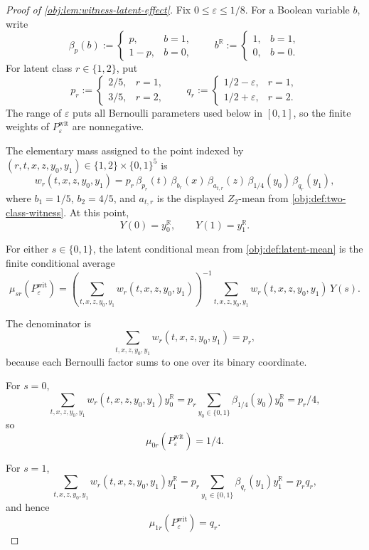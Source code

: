 \begin{proof}[Proof of \cref{obj:lem:witness-latent-effect}]
Fix \(0\le\varepsilon\le 1/8\).  For a Boolean variable \(b\), write
\[
\beta_p(b):=
\begin{cases}
p, & b=1,\\
1-p, & b=0,
\end{cases}
\qquad
b^{\mathbb R}:=
\begin{cases}
1, & b=1,\\
0, & b=0.
\end{cases}
\]
For latent class \(r\in\{1,2\}\), put
\[
p_r:=
\begin{cases}
2/5, & r=1,\\
3/5, & r=2,
\end{cases}
\qquad
q_r:=
\begin{cases}
1/2-\varepsilon, & r=1,\\
1/2+\varepsilon, & r=2.
\end{cases}
\]
The range of \(\varepsilon\) puts all Bernoulli parameters used below in \([0,1]\), so the finite weights of \(P_{\varepsilon}^{\mathrm{wit}}\) are nonnegative. %

The elementary mass assigned to the point indexed by
\((r,t,x,z,y_0,y_1)\in\{1,2\}\times\{0,1\}^5\) is
\[
w_r(t,x,z,y_0,y_1)
=
p_r\,\beta_{p_r}(t)\,\beta_{b_r}(x)\,\beta_{a_{t,r}}(z)\,
\beta_{1/4}(y_0)\,\beta_{q_r}(y_1),
\]
where \(b_1=1/5\), \(b_2=4/5\), and \(a_{t,r}\) is the displayed \(Z_2\)-mean from \cref{obj:def:two-class-witness}.  At this point,
\[
Y(0)=y_0^{\mathbb R},
\qquad
Y(1)=y_1^{\mathbb R}.
\] %

For either \(s\in\{0,1\}\), the latent conditional mean from \cref{obj:def:latent-mean} is the finite conditional average
\[
\mu_{sr}(P_{\varepsilon}^{\mathrm{wit}})
=
\left(\sum_{t,x,z,y_0,y_1}w_r(t,x,z,y_0,y_1)\right)^{-1}
\sum_{t,x,z,y_0,y_1}
w_r(t,x,z,y_0,y_1)\,Y(s).
\] %

The denominator is
\[
\sum_{t,x,z,y_0,y_1}w_r(t,x,z,y_0,y_1)
=
p_r,
\]
because each Bernoulli factor sums to one over its binary coordinate. %

For \(s=0\),
\[
\sum_{t,x,z,y_0,y_1}
w_r(t,x,z,y_0,y_1)y_0^{\mathbb R}
=
p_r\sum_{y_0\in\{0,1\}}\beta_{1/4}(y_0)y_0^{\mathbb R}
=
p_r/4,
\]
so
\[
\mu_{0r}(P_{\varepsilon}^{\mathrm{wit}})=1/4.
\] %

For \(s=1\),
\[
\sum_{t,x,z,y_0,y_1}
w_r(t,x,z,y_0,y_1)y_1^{\mathbb R}
=
p_r\sum_{y_1\in\{0,1\}}\beta_{q_r}(y_1)y_1^{\mathbb R}
=
p_r q_r,
\]
and hence
\[
\mu_{1r}(P_{\varepsilon}^{\mathrm{wit}})=q_r.
\] %


\end{proof}
